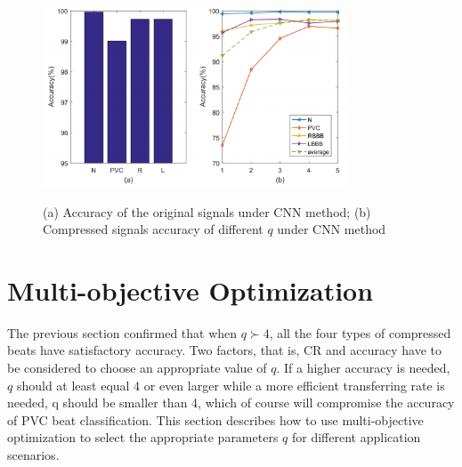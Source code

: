 \documentclass[journal]{IEEEtran}
\begin{document}
\begin{figure}
	\centering
	\includegraphics[width=9cm]{CNNAccuracy3.pdf}\\
	\caption{(a) Accuracy of the original signals under CNN method; (b) Compressed signals accuracy of different $q$ under CNN method}
	\label{CNNAccuracy1}
\end{figure}

\section{Multi-objective Optimization }
The previous section confirmed that when $q\succ4$, all the four types of compressed beats have satisfactory accuracy. Two factors, that is, CR and accuracy have to be considered to choose an appropriate value of $q$. If a higher accuracy is needed, $q$ should at least equal 4 or even larger while a more efficient transferring rate is needed, q should be smaller than 4, which of course will compromise the accuracy of PVC beat classification. This section describes how to use multi-objective optimization to select the appropriate parameters $q$ for different application scenarios.
\end{document}
